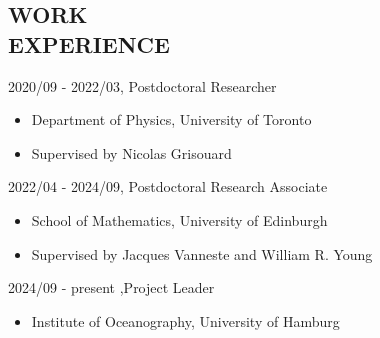 \documentclass[margin]{res}
\begin{document}
\begin{resume}
\section{{\normalfont WORK \\EXPERIENCE}}
2020/09 - 2022/03, Postdoctoral Researcher
\begin{itemize}[leftmargin=*,noitemsep]
\item[]{Department of Physics, University of Toronto}
\item[]{Supervised by Nicolas Grisouard}
\end{itemize}
2022/04 - 2024/09, Postdoctoral Research Associate
\begin{itemize}[leftmargin=*,noitemsep]
\item[]{School of Mathematics, University of Edinburgh}
\item[]{Supervised by  Jacques Vanneste and William R. Young }
\end{itemize}
2024/09 - present ,Project Leader
\begin{itemize}[leftmargin=*,noitemsep]
\item[]{Institute of Oceanography, University of Hamburg}
\end{itemize}



\end{resume}
\end{document}
